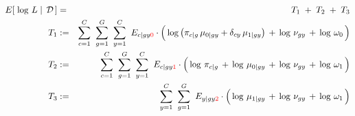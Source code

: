 \begin{eqnarray*}
E\!\left[\,\left.\log\,L\;\right\vert\;\mathcal{D}\,\right]
&=& T_{1} \;+\; T_{2} \;+\; T_{3}
\\
T_{1}
&:=&
	\overset{C}{\underset{c=1}{\sum}}\;\;
	\overset{G}{\underset{g=1}{\sum}}\;\;
	\overset{C}{\underset{y=1}{\sum}}\;\;
	E_{c \vert gy{\color{red}0}}
	\cdot
	\left(\,
		\log\left(\pi_{c \vert g}\,\mu_{0 \vert gy} + \delta_{cy}\,\mu_{1\vert gy}\right)
		\,\overset{{\color{white}.}}{+}\,
		\log\,\nu_{gy}
		\,\overset{{\color{white}.}}{+}\,
		\log\,\omega_{0}
	\,\right)
\\
T_{2}
&:=&
	\overset{C}{\underset{c=1}{\sum}}\;\;
	\overset{G}{\underset{g=1}{\sum}}\;\;
	\overset{C}{\underset{y=1}{\sum}}\;\;
	E_{c \vert gy{\color{red}1}}
	\cdot
	\left(\,
		\log\,\pi_{c \vert g}
		\,\overset{{\color{white}.}}{+}\,
		\log\,\mu_{0\vert gy}
		\,\overset{{\color{white}.}}{+}\,
		\log\,\nu_{gy}
		\,\overset{{\color{white}.}}{+}\,
		\log\,\omega_{1}
	\,\right)
\\
T_{3}
&:=&
	\overset{C}{\underset{y=1}{\sum}}\;\;
	\overset{G}{\underset{g=1}{\sum}}\;\;
	E_{y \vert gy{\color{red}2}}
	\cdot
	\left(\,
		\log\,\mu_{1 \vert gy}
		\,\overset{{\color{white}.}}{+}\,
		\log\,\nu_{gy}
		\,\overset{{\color{white}.}}{+}\,
		\log\,\omega_{1}
	\,\right)
\end{eqnarray*}

